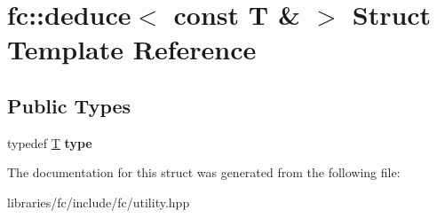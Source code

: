 \hypertarget{structfc_1_1deduce_3_01const_01_t_01_6_01_4}{}\section{fc\+:\+:deduce$<$ const T \& $>$ Struct Template Reference}
\label{structfc_1_1deduce_3_01const_01_t_01_6_01_4}
\subsection*{Public Types}
\begin{DoxyCompactItemize}
\item 
\mbox{\label{structfc_1_1deduce_3_01const_01_t_01_6_01_4_a04cec5e1f651df3b8beb9296b0f772c7}} 
typedef \mbox{\hyperlink{struct_t}{T}} {\bfseries type}
\end{DoxyCompactItemize}


The documentation for this struct was generated from the following file\+:\begin{DoxyCompactItemize}
\item 
libraries/fc/include/fc/utility.\+hpp\end{DoxyCompactItemize}
